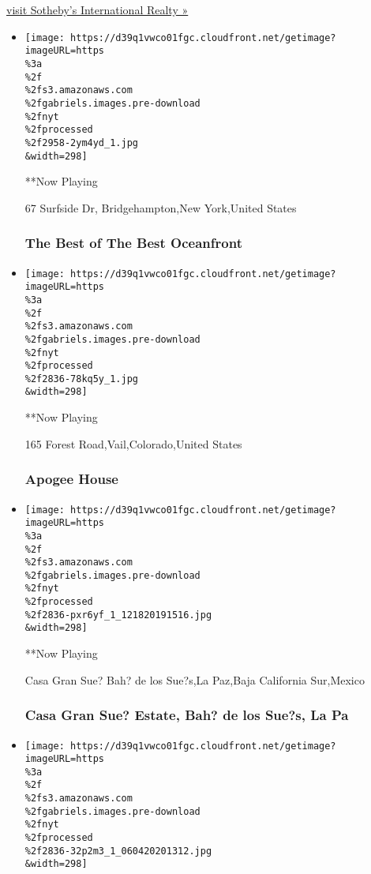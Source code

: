 \href{http://www.sothebysrealty.com/eng}{visit Sotheby's International
Realty »}

\begin{itemize}
\item
  \texttt{[image: https://d39q1vwco01fgc.cloudfront.net/getimage?imageURL=https\\\%3a\\\%2f\\\%2fs3.amazonaws.com\\\%2fgabriels.images.pre-download\\\%2fnyt\\\%2fprocessed\\\%2f2958-2ym4yd\_1.jpg\\\&width=298]}

  **Now Playing

  67 Surfside Dr, Bridgehampton,New York,United States

  \hypertarget{the-best-of-the-best-oceanfront}{%
  \subsubsection{The Best of The Best
  Oceanfront}\label{the-best-of-the-best-oceanfront}}
\item
  \texttt{[image: https://d39q1vwco01fgc.cloudfront.net/getimage?imageURL=https\\\%3a\\\%2f\\\%2fs3.amazonaws.com\\\%2fgabriels.images.pre-download\\\%2fnyt\\\%2fprocessed\\\%2f2836-78kq5y\_1.jpg\\\&width=298]}

  **Now Playing

  165 Forest Road,Vail,Colorado,United States

  \hypertarget{apogee-house}{%
  \subsubsection{Apogee House}\label{apogee-house}}
\item
  \texttt{[image: https://d39q1vwco01fgc.cloudfront.net/getimage?imageURL=https\\\%3a\\\%2f\\\%2fs3.amazonaws.com\\\%2fgabriels.images.pre-download\\\%2fnyt\\\%2fprocessed\\\%2f2836-pxr6yf\_1\_121820191516.jpg\\\&width=298]}

  **Now Playing

  Casa Gran Sue? Bah? de los Sue?s,La Paz,Baja California Sur,Mexico

  \hypertarget{casa-gran-sue-estate-bah-de-los-sues-la-pa}{%
  \subsubsection{Casa Gran Sue? Estate, Bah? de los Sue?s, La
  Pa}\label{casa-gran-sue-estate-bah-de-los-sues-la-pa}}
\item
  \texttt{[image: https://d39q1vwco01fgc.cloudfront.net/getimage?imageURL=https\\\%3a\\\%2f\\\%2fs3.amazonaws.com\\\%2fgabriels.images.pre-download\\\%2fnyt\\\%2fprocessed\\\%2f2836-32p2m3\_1\_060420201312.jpg\\\&width=298]}


\end{itemize}
